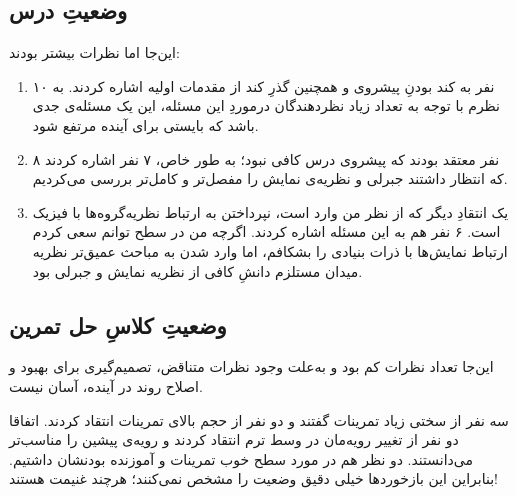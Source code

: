 \documentclass[]{article}
\numberwithin{equation}{section}
\begin{document}
\subsection*{وضعیتِ درس}
این‌جا اما نظرات بیشتر بودند:

\begin{enumerate}
	\item ۱۰ نفر به کند بودنِ پیشروی و همچنین گذرِ کند از مقدمات اولیه اشاره کردند. به نظرم با توجه به تعداد زیاد نظر‌دهندگان درموردِ این مسئله، این یک مسئله‌ی جدی باشد که بایستی برای آینده مرتفع شود.
	\item
	۸ نفر معتقد بودند که پیشروی درس کافی نبود؛ به طور خاص، ۷ نفر اشاره کردند که انتظار داشتند جبرلی و نظریه‌ی نمایش را مفصل‌تر و کامل‌تر بررسی می‌کردیم.
	\item
	یک انتقادِ دیگر که از نظر من وارد است، نپرداختن به ارتباط نظریه‌گروه‌ها با فیزیک است. ۶ نفر هم به این مسئله اشاره کردند. اگرچه من در سطح توانم سعی کردم ارتباط نمایش‌ها با ذرات بنیادی را بشکافم، اما وارد شدن به مباحث عمیق‌تر نظریه میدان مستلزم دانشِ کافی از نظریه نمایش و جبرلی بود.
\end{enumerate}

\subsection*{وضعیتِ کلاسِ حل تمرین}
این‌جا تعداد نظرات کم بود و به‌علت وجود نظرات متناقض، تصمیم‌گیری برای بهبود و اصلاح روند در آینده، آسان نیست.

سه نفر از سختی زیاد تمرینات گفتند و دو نفر از حجم بالای تمرینات انتقاد کردند. اتفاقا دو نفر از تغییر رویه‌مان در وسط ترم انتقاد کردند و رویه‌ی پیشین را مناسب‌تر می‌دانستند. دو نظر هم در مورد سطح خوب تمرینات و آموزنده بودنشان داشتیم. بنابراین این بازخوردها خیلی دقیق وضعیت را مشخص نمی‌کنند؛ هرچند غنیمت هستند!
\end{document}
